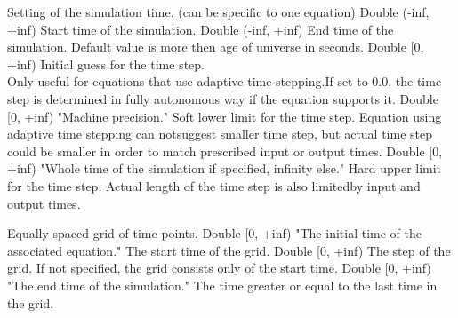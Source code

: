 \begin{RecordType}
	{}
	{} %
	{} %
	{} %
	{{{Setting of the simulation time. (can be specific to one equation)}}}
		\KeyItem
			{}
			{{Double (-inf, +inf)}}
			{\textrangle}
			{} %
			{{{Start time of the simulation.}}}
		\KeyItem
			{}
			{{Double (-inf, +inf)}}
			{\textrangle}
			{} %
			{{{End time of the simulation. Default value is more then age of universe in seconds.}}}
		\KeyItem
			{}
			{{Double [0, +inf)}}
			{\textrangle}
			{} %
			{{{Initial guess for the time step.}\\{
Only useful for equations that use adaptive time stepping.If set to 0.0, the time step is determined in fully autonomous way if the equation supports it.}}}
		\KeyItem
			{}
			{{Double [0, +inf)}}
			{"{Machine precision.}"}
			{} %
			{{{Soft lower limit for the time step. Equation using adaptive time stepping can notsuggest smaller time step, but actual time step could be smaller in order to match prescribed input or output times.}}}
		\KeyItem
			{}
			{{Double [0, +inf)}}
			{"{Whole time of the simulation if specified, infinity else.}"}
			{} %
			{{{Hard upper limit for the time step. Actual length of the time step is also limitedby input and output times.}}}
\end{RecordType}
\begin{RecordType}
	{}
	{} %
	{} %
	{} %
	{{{Equally spaced grid of time points.}}}
		\KeyItem
			{}
			{{Double [0, +inf)}}
			{"{The initial time of the associated equation.}"}
			{} %
			{{{The start time of the grid.}}}
		\KeyItem
			{}
			{{Double [0, +inf)}}
			{\textrangle}
			{} %
			{{{The step of the grid. If not specified, the grid consists only of the start time.}}}
		\KeyItem
			{}
			{{Double [0, +inf)}}
			{"{The end time of the simulation.}"}
			{} %
			{{{The time greater or equal to the last time in the grid.}}}
\end{RecordType}
